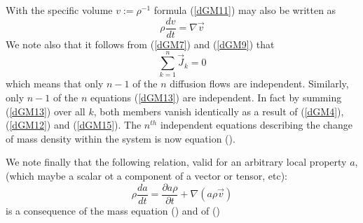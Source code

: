 With the specific volume $v:=\rho^{-1}$ formula (\ref{dGM11}) may also be written as
\begin{equation}
\rho \frac{dv}{dt} = \nabla \vec{v}
\label{dGM13}
\end{equation}
We note also that it follows from (\ref{dGM7}) and (\ref{dGM9}) that 
\begin{equation}
\sum_{k=1}^n \vec{J}_k =0 
\label{dGM15}
\end{equation}
which means that only $n-1$ of the $n$ diffusion flows are independent.
Similarly, only $n-1$ of the $n$ equations (\ref{dGM13}) are independent. In fact by summing (\ref{dGM13}) over all $k$, both members vanish identically as a result of (\ref{dGM4}), (\ref{dGM12}) and (\ref{dGM15}). The $n^{th}$ independent equations describing the change of mass density within the system is now equation (\label{dGM14}).

We note finally that the following relation, valid for an arbitrary local property $a$, (which maybe a scalar ot a component of a vector or tensor, etc):
\begin{equation}
\rho \frac{da}{dt} = \frac{\partial a\rho}{\partial t} + \nabla ( a \rho \vec{v})
\label{dGM16}
\end{equation}
is a consequence of the mass equation (\label{dGM5}) and of (\label{dGM8})